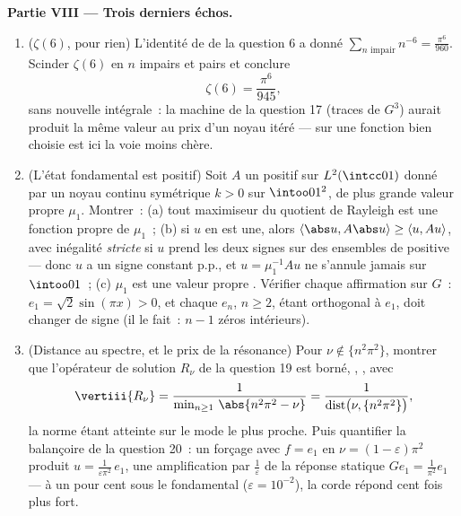 \begin{problem}
\medskip
\noindent\textbf{Partie VIII --- Trois derniers échos.}
\begin{enumerate}[resume]
  \item ($\zeta(6)$, pour rien) L'identité de  de la
        question 6 a donné $\sum_{n\text{ impair}}n^{-6} =
        \frac{\pi^6}{960}$. Scinder $\zeta(6)$ en $n$
        impairs et pairs et conclure
        \[
        \zeta(6) = \frac{\pi^6}{945},
        \]
        sans nouvelle intégrale~: la machine de la question
        17 (traces de $G^3$) aurait produit la même valeur
        au prix d'un noyau itéré ---  sur une
        fonction bien choisie est ici la voie moins chère.
  \item (L'état fondamental est positif) Soit $A$ un
          positif sur
        $L^2(\intcc01)$ donné par un noyau continu
        symétrique $k > 0$ sur $\intoo01^2$, de plus grande
        valeur propre $\mu_1$. Montrer~: (a) tout maximiseur
        du quotient de Rayleigh est une fonction propre de
        $\mu_1$~; (b) si $u$ en est une, alors
        $\langle\abs u, A\abs u\rangle \geq \langle u,
        Au\rangle$, avec inégalité \emph{stricte} si $u$
        prend les deux signes sur des ensembles de 
        positive --- donc $u$ a un signe constant p.p., et
        $u = \mu_1^{-1}Au$ ne s'annule jamais sur
        $\intoo01$~; (c) $\mu_1$ est une valeur propre
        \emph{}. Vérifier chaque affirmation sur $G$~:
        $e_1 = \sqrt2\sin(\pi x) > 0$, et chaque $e_n$, $n
        \geq 2$, étant orthogonal à $e_1$, doit changer de
        signe (il le fait~: $n - 1$ zéros intérieurs).
  \item (Distance au spectre, et le prix de la résonance)
        Pour $\nu \notin \{n^2\pi^2\}$, montrer que
        l'opérateur de solution $R_\nu$ de la question 19 est
        borné, , , avec
        \[
        \vertiii{R_\nu} =
        \frac1{\min_{n\geq1}\,\abs{n^2\pi^2 - \nu}}
        = \frac1{\operatorname{dist}\bigl(\nu,
        \{n^2\pi^2\}\bigr)},
        \]
        la norme étant atteinte sur le mode le plus proche.
        Puis quantifier la balançoire de la question 20~: un
        forçage avec $f = e_1$ en $\nu = (1 -
        \varepsilon)\pi^2$ produit $u =
        \frac{1}{\varepsilon\pi^2}\,e_1$, une amplification
        par $\frac1\varepsilon$ de la réponse statique $Ge_1
        = \frac1{\pi^2}e_1$ --- à un pour cent sous le
        fondamental ($\varepsilon = 10^{-2}$), la corde
        répond cent fois plus fort.
\end{enumerate}
\end{problem}
